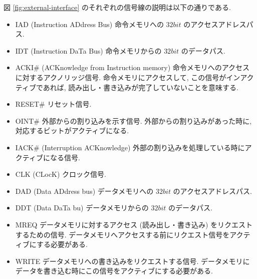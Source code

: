 \documentclass[../specifications.tex]{subfiles}
\begin{document}
  図 \ref{fig:external-interface} のそれぞれの信号線の説明は以下の通りである.
  \begin{itemize}
    \item IAD (Instruction ADdress Bus)
    \newline 命令メモリへの $32bit$ のアクセスアドレスパス.

    \item IDT (Instruction DaTa Bus)
    \newline 命令メモリからの $32bit$ のデータパス.

    \item ACKI\# (ACKnowledge from Instruction memory)
    \newline 命令メモリへのアクセスに対するアクノリッジ信号.
    命令メモリにアクセスして, この信号がインアクティブであれば, 
    読み出し・書き込みが完了していないことを意味する.
    
    \item RESET\#
    \newline リセット信号.

    \item OINT\#
    \newline 外部からの割り込みを示す信号.
    外部からの割り込みがあった時に, 対応するビットがアクティブになる.

    \item IACK\# (Interruption ACKnowledge)
    \newline 外部の割り込みを処理している時にアクティブになる信号.

    \item CLK (CLocK)
    \newline クロック信号.

    \item DAD (Data ADdress bus)
    \newline データメモリへの $32bit$ のアクセスアドレスパス.

    \item DDT (Data DaTa bu)
    \newline データメモリからの $32bit$ のデータパス.

    \item MREQ
    \newline データメモリに対するアクセス (読み出し・書き込み) をリクエストするための信号.
    データメモリへアクセスする前にリクエスト信号をアクティブにする必要がある.

    \item WRITE
    \newline データメモリへの書き込みをリクエストする信号.
    データメモリにデータを書き込む時にこの信号をアクティブにする必要がある.


\end{itemize}
\end{document}

